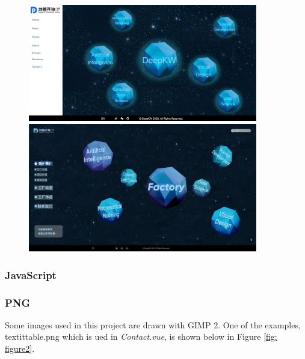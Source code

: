 \documentclass{article}
\begin{document}
\begin{figure}[h]
    \centering
    \includegraphics[width=10cm]{img/exp/css.png}
    \includegraphics[width=10cm]{img/05.jpg}
    \caption{}
    \label{}
\end{figure}

\subsubsection{JavaScript}
\subsubsection{PNG}
Some images used in this project are drawn with GIMP 2. One of the examples,
textit{table.png} which is ued in \textit{Contact.vue}, is shown below in 
Figure \ref{fig: figure2}.
\end{document}
